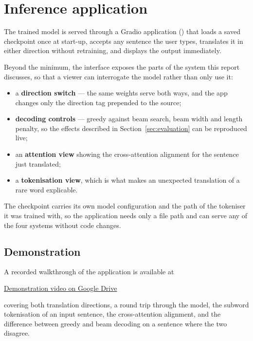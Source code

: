 \documentclass[11pt,a4paper]{article}
\begin{document}
\section{Inference application}
\label{sec:app}

The trained model is served through a Gradio application
() that loads a saved checkpoint once at start-up, accepts any
sentence the user types, translates it in either direction without retraining,
and displays the output immediately.

Beyond the minimum, the interface exposes the parts of the system this report
discusses, so that a viewer can interrogate the model rather than only use it:

\begin{itemize}
  \item a \textbf{direction switch} --- the same weights serve both ways, and
    the app changes only the direction tag prepended to the source;
  \item \textbf{decoding controls} --- greedy against beam search, beam width
    and length penalty, so the effects described in
    Section~\ref{sec:evaluation} can be reproduced live;
  \item an \textbf{attention view} showing the cross-attention alignment for
    the sentence just translated;
  \item a \textbf{tokenisation view}, which is what makes an unexpected
    translation of a rare word explicable.
\end{itemize}

The checkpoint carries its own model configuration and the path of the
tokeniser it was trained with, so the application needs only a file path and
can serve any of the four systems without code changes.

\subsection*{Demonstration}

A recorded walkthrough of the application is available at

\begin{center}
\href{https://drive.google.com/file/d/19z4fEsQfhgtJMMy6xaw2-D33NoixSP75/view?usp=sharing}{Demonstration video on Google Drive}
\end{center}

\noindent
covering both translation directions, a round trip through the model, the
subword tokenisation of an input sentence, the cross-attention alignment, and
the difference between greedy and beam decoding on a sentence where the two
disagree.
\end{document}
